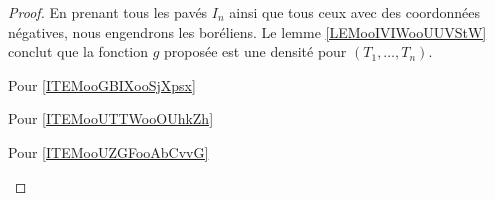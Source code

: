 \begin{proof}
	En prenant tous les pavés \( I_n\) ainsi que tous ceux avec des coordonnées négatives, nous engendrons les boréliens. Le lemme \ref{LEMooIVIWooUUVStW} conclut que la fonction \( g\) proposée est une densité pour \( (T_1,\ldots, T_n)\).


	\begin{center}
		Pour \ref{ITEMooGBIXooSjXpsx}
	\end{center}

	\begin{center}
		Pour \ref{ITEMooUTTWooOUhkZh}
	\end{center}



	\begin{center}
		Pour \ref{ITEMooUZGFooAbCvvG}
	\end{center}
	\begin{subproof}



\end{subproof}
\end{proof}
